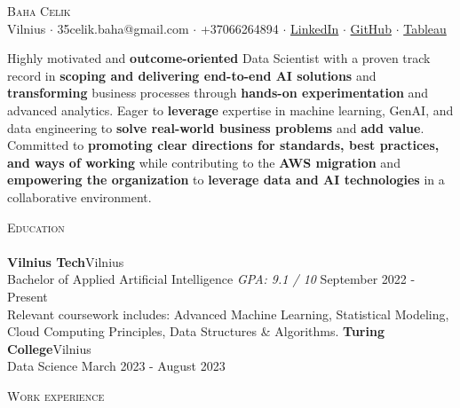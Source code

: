 \documentclass[a4paper]{article}
\newcommand{\lineunder} {
    \vspace*{-8pt} \\
    \hspace*{-18pt} \hrulefill \\
}
\newcommand{\header} [1] {
    {\hspace*{-18pt}\vspace*{6pt} \textsc{#1}}
    \vspace*{-6pt} \lineunder
}
\begin{document}
\vspace*{-40pt}

    

\vspace*{-10pt}
\begin{center}
	{\Huge \scshape {Baha Celik}}\\
	Vilnius $\cdot$ 35celik.baha@gmail.com $\cdot$ +37066264894 $\cdot$ 
	\href{https://www.linkedin.com/in/baha-celik-345698257}{LinkedIn} $\cdot$ 
	\href{https://github.com/p3rc1va1}{GitHub} $\cdot$
    \href{https://public.tableau.com/app/profile/baha.celik/vizzes}{Tableau}
\end{center}

\vspace{5pt}
\noindent Highly motivated and \textbf{outcome-oriented} Data Scientist with a proven track record in \textbf{scoping and delivering end-to-end AI solutions} and \textbf{transforming} business processes through \textbf{hands-on experimentation} and advanced analytics. Eager to \textbf{leverage} expertise in machine learning, GenAI, and data engineering to \textbf{solve real-world business problems} and \textbf{add value}. Committed to \textbf{promoting clear directions for standards, best practices, and ways of working} while contributing to the \textbf{AWS migration} and \textbf{empowering the organization} to \textbf{leverage data and AI technologies} in a collaborative environment.
\vspace{5pt}

\header{Education}
\textbf{Vilnius Tech}\hfill Vilnius\\
Bachelor of Applied Artificial Intelligence \textit{GPA: 9.1 / 10} \hfill September 2022 - Present\\
Relevant coursework includes: Advanced Machine Learning, Statistical Modeling, Cloud Computing Principles, Data Structures \& Algorithms.
\vspace{2mm}
\textbf{Turing College}\hfill Vilnius\\
Data Science \hfill March 2023 - August 2023\\
\vspace{2mm}

\header{Work experience}
\vspace{1mm}
\end{document}
